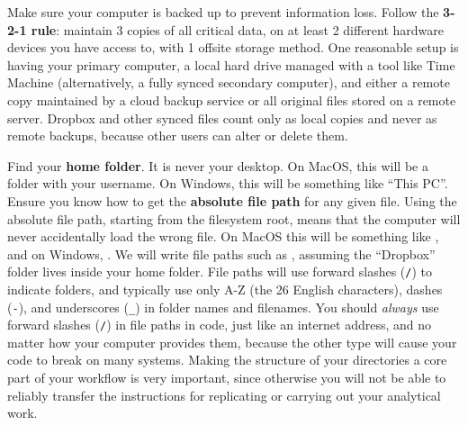 Make sure your computer is backed up to prevent information loss.
Follow the \textbf{3-2-1 rule}: maintain 3 copies of all critical data,
on at least 2 different hardware devices you have access to,
with 1 offsite storage method.
One reasonable setup is having your primary computer,
a local hard drive managed with a tool like Time Machine
(alternatively, a fully synced secondary computer),
and either a remote copy maintained by a cloud backup service
or all original files stored on a remote server.
Dropbox and other synced files count only as local copies and never as remote backups,
because other users can alter or delete them.

Find your \textbf{home folder}. It is never your desktop.
On MacOS, this will be a folder with your username.
On Windows, this will be something like ``This PC''.
Ensure you know how to get the \textbf{absolute file path} for any given file.
Using the absolute file path, starting from the filesystem root,
means that the computer will never accidentally load the wrong file.
On MacOS this will be something like ,
and on Windows, .
We will write file paths such as ,
assuming the ``Dropbox'' folder lives inside your home folder.
File paths will use forward slashes (\texttt{/}) to indicate folders,
and typically use only A-Z (the 26 English characters),
dashes (\texttt{-}), and underscores (\texttt{\_}) in folder names and filenames.
You should \textit{always} use forward slashes (\texttt{/}) in file paths in code,
just like an internet address, and no matter how your computer provides them,
because the other type will cause your code to break on many systems.
Making the structure of your directories a core part of your workflow is very important,
since otherwise you will not be able to reliably transfer the instructions
for replicating or carrying out your analytical work.

